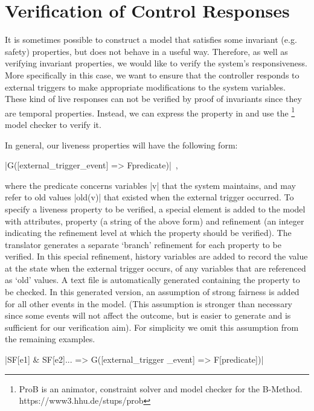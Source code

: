 

\section{Verification of Control Responses}
\label{sec:verificationResponses}

It is sometimes possible to construct a model that satisfies some invariant (e.g. safety) properties, but does not behave in a useful way.
Therefore, as well as verifying invariant properties, we would like to verify the system's responsiveness.  More specifically in this case, we want to ensure that the controller responds to external triggers to make appropriate modifications to the system variables. 
These kind of live responses can not be verified by proof of invariants since they are temporal properties.
Instead, we can express the property in \LTL  and use the \PROB\footnote{ProB is an animator, constraint solver and model checker for the B-Method. https://www3.hhu.de/stups/prob} model checker to verify it.

In general, our liveness properties will have the following form:
\begin{center}
  |G([external_trigger_event] => F{predicate})|~,
\end{center}
where the predicate concerns variables |v| that the system maintains, and may refer to old values |old(v)| that existed when the external trigger occurred.
To specify a liveness property to be verified, a special \LTL element is added to the \SCXML model with attributes, property (a string of the above form)  and refinement (an integer indicating the refinement level at which the property should be verified).
The translator generates a separate `branch' refinement for each \LTL property to be verified. 
In this special refinement, history variables are added to record the value at the state when the external trigger occurs, of any variables that are referenced as `old' values.
A text file is automatically generated containing the \LTL property to be checked. 
In this generated version, an assumption of strong fairness is added for all other events in the model.
(This assumption is stronger than necessary since some events will not affect the outcome, but is easier to generate and is sufficient for our verification aim). 
For simplicity we omit this assumption from the remaining examples.
\begin{center}
  |SF[e1] & SF[e2]... => G([external_trigger _event] => F[predicate])|
\end{center}

